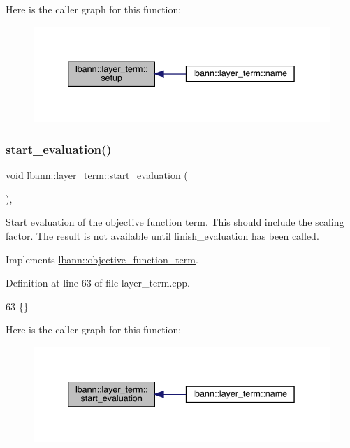 Here is the caller graph for this function\+:\nopagebreak
\begin{figure}[H]
\begin{center}
\leavevmode
\includegraphics[width=339pt]{classlbann_1_1layer__term_ae6d84339fb80384ca2bf898fb854a7c9_icgraph}
\end{center}
\end{figure}
\mbox{\label{classlbann_1_1layer__term_ae2ab6b694701db724345573416ce0427}} 
\subsubsection{\texorpdfstring{start\+\_\+evaluation()}{start\_evaluation()}}
{\footnotesize\ttfamily void lbann\+::layer\+\_\+term\+::start\+\_\+evaluation (\begin{DoxyParamCaption}{ }\end{DoxyParamCaption})\hspace{0.3cm}{\ttfamily [override]}, {\ttfamily [virtual]}}

Start evaluation of the objective function term. This should include the scaling factor. The result is not available until finish\+\_\+evaluation has been called. 

Implements \hyperlink{classlbann_1_1objective__function__term_a0af4dfd71fb30e43d1ae7611172ad9b0}{lbann\+::objective\+\_\+function\+\_\+term}.



Definition at line 63 of file layer\+\_\+term.\+cpp.


\begin{DoxyCode}
63 \{\}
\end{DoxyCode}
Here is the caller graph for this function\+:\nopagebreak
\begin{figure}[H]
\begin{center}
\leavevmode
\includegraphics[width=339pt]{classlbann_1_1layer__term_ae2ab6b694701db724345573416ce0427_icgraph}
\end{center}
\end{figure}


